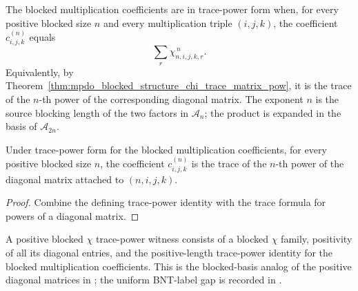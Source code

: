 \begin{definition}%
    \label{def:mpdo_has_blocked_structure_chi_trace_power_form}
    \leanok
    The blocked multiplication coefficients are in trace-power form when, for
    every positive blocked size $n$ and every multiplication triple $(i,j,k)$,
    the coefficient $c^{(n)}_{i,j,k}$ equals
    \[
        \sum_r \chi_{n,i,j,k,r}^{\,n}.
    \]
    Equivalently, by
    Theorem~\ref{thm:mpdo_blocked_structure_chi_trace_matrix_pow}, it is the
    trace of the $n$-th power of the corresponding diagonal matrix. The exponent
    $n$ is the source blocking length of the two factors in $\mathcal{A}_n$; the
    product is expanded in the basis of $\mathcal{A}_{2n}$.
\end{definition}

\begin{theorem}%
    \label{thm:mpdo_blocked_structure_chi_eq_trace_matrix_pow}
    \leanok
    Under trace-power form for the blocked multiplication coefficients,
    for every positive blocked size $n$, the coefficient $c^{(n)}_{i,j,k}$ is
    the trace of the $n$-th power of the diagonal matrix attached to
    $(n,i,j,k)$.
\end{theorem}
\begin{proof}\leanok
    Combine the defining trace-power identity with the trace formula for
    powers of a diagonal matrix.
\end{proof}

\begin{definition}%
    \label{def:mpdo_positive_blocked_structure_chi_trace_power_form}
    \leanok
    A positive blocked $\chi$ trace-power witness consists of a blocked
    $\chi$ family, positivity of all its diagonal entries, and the
    positive-length trace-power identity for the blocked multiplication
    coefficients. This is the blocked-basis analog of the positive
    diagonal matrices in
    \cite[Theorem~4.14(ii)]{Cirac2016MPDO_arXiv}; the uniform BNT-label gap
    is recorded in
    .
\end{definition}

